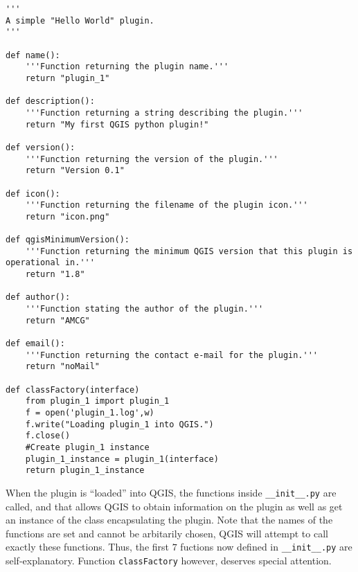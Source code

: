 \begin{lstlisting}
'''
A simple "Hello World" plugin.
'''

def name():
    '''Function returning the plugin name.'''
    return "plugin_1"

def description():
    '''Function returning a string describing the plugin.'''
    return "My first QGIS python plugin!"

def version():
    '''Function returning the version of the plugin.'''
    return "Version 0.1"

def icon():
    '''Function returning the filename of the plugin icon.'''
    return "icon.png"

def qgisMinimumVersion():
    '''Function returning the minimum QGIS version that this plugin is operational in.'''
    return "1.8"

def author():
    '''Function stating the author of the plugin.'''
    return "AMCG"

def email():
    '''Function returning the contact e-mail for the plugin.'''
    return "noMail"

def classFactory(interface)
    from plugin_1 import plugin_1
    f = open('plugin_1.log',w)
    f.write("Loading plugin_1 into QGIS.")
    f.close()
    #Create plugin_1 instance
    plugin_1_instance = plugin_1(interface)
    return plugin_1_instance
\end{lstlisting}
When the plugin is ``loaded'' into QGIS, the functions inside \lstinline{__init__.py} are called, and that allows QGIS to obtain information on the plugin as well as get an instance of the class encapsulating the plugin. Note that the names of the functions are set and cannot be arbitarily chosen, QGIS will attempt to call exactly these functions. Thus, the first $7$ fuctions now defined in \lstinline{__init__.py} are self-explanatory. Function \lstinline{classFactory} however, deserves special attention.
